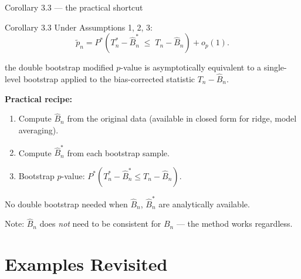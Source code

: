 \documentclass[10pt,aspectratio=169]{beamer}
\theoremstyle{plain}
\newcommand{\Pstar}{P^{*}}
\newcommand{\Tn}{T_{n}}
\newcommand{\Tns}{T_{n}^{*}}
\newcommand{\Bn}{B_{n}}
\newcommand{\Bnh}{\hat{B}_{n}}
\newcommand{\Bnhs}{\hat{B}_{n}^{*}}
\newcommand{\pnt}{\tilde{p}_{n}}
\begin{document}
\begin{frame}{Corollary 3.3 --- the practical shortcut}

  \begin{block}{Corollary 3.3}
    Under Assumptions 1, 2, 3:
    \[
      \pnt = \Pstar(\Tns - \Bnhs \;\le\; \Tn - \Bnh) + o_p(1).
    \]
  \end{block}

  \bigskip

   the double bootstrap modified $p$-value is asymptotically equivalent to a
  \alert{single-level bootstrap} applied to the bias-corrected statistic $\Tn - \Bnh$.

  \bigskip

  \textbf{Practical recipe:}
  \begin{enumerate}
    \setlength{\itemsep}{4pt}
    \item Compute $\Bnh$ from the original data (available in closed form for ridge, model averaging).
    \item Compute $\Bnhs$ from each bootstrap sample.
    \item Bootstrap $p$-value: $\Pstar(\Tns - \Bnhs \le \Tn - \Bnh)$.
  \end{enumerate}

  \medskip

  No double bootstrap needed when $\Bnh$, $\Bnhs$ are analytically available.

  \medskip

  \footnotesize
  Note: $\Bnh$ does \textit{not} need to be consistent for $\Bn$ --- the method works
  regardless.

\end{frame}
\section{Examples Revisited}
\end{document}
